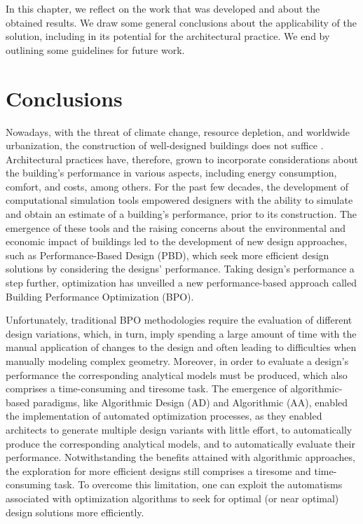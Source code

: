 \label{chap:conclusion}

In this chapter, we reflect on the work that was developed and about the obtained results. We draw some general conclusions about the applicability of the solution, including in its potential for the architectural practice. We end by outlining some guidelines for future work. 

\section{Conclusions}

Nowadays, with the threat of climate change, resource depletion, and worldwide urbanization, the construction of well-designed buildings does not suffice \cite{Wortmann2015AdvSBO}. Architectural practices have, therefore, grown to incorporate considerations about the building's performance in various aspects, including energy consumption, comfort, and costs, among others. For the past few decades, the development of computational simulation tools empowered designers with the ability to simulate and obtain an estimate of a building’s performance, prior to its construction. The emergence of these tools and the raising concerns about the environmental and economic impact of buildings led to the development of new design approaches, such as Performance-Based Design (PBD), which seek more efficient design solutions by considering the designs’ performance. Taking design’s performance a step further, optimization has unveilled a new performance-based approach called Building Performance Optimization (BPO). 

Unfortunately, traditional \ac{BPO} methodologies require the evaluation of different design variations, which, in turn, imply spending a large amount of time with the manual application of changes to the design and often leading to difficulties when manually modeling complex geometry. Moreover, in order to evaluate a design's performance the corresponding analytical models must be produced, which also comprises a time-consuming and tiresome task. The emergence of algorithmic-based paradigms, like Algorithmic Design (AD) and Algorithmic (AA), enabled the implementation of automated optimization processes, as they enabled architects to generate multiple design variants with little effort, to automatically produce the corresponding analytical models, and to automatically evaluate their performance. Notwithstanding the benefits attained with algorithmic approaches, the exploration for more efficient designs still comprises a tiresome and time-consuming task. To overcome this limitation, one can exploit the automatisms associated with optimization algorithms to seek for optimal (or near optimal) design solutions more efficiently.

